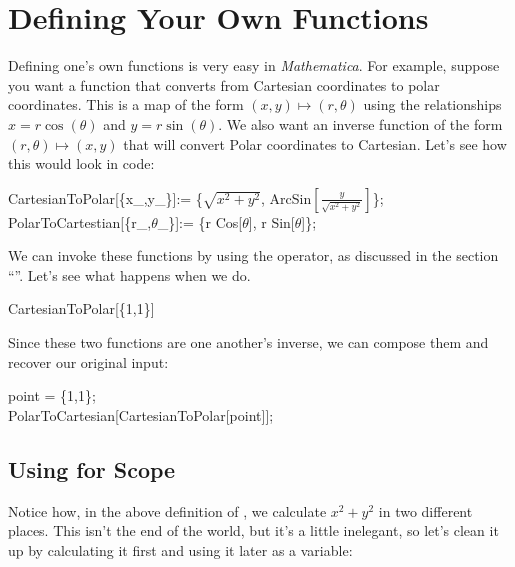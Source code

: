 \chapter{Defining Your Own Functions}
\label{chap:Functions}

Defining one's own functions is very easy in \emph{Mathematica}. For example, suppose you want a function that converts from Cartesian coordinates to polar coordinates. This is a map of the form $(x,y) \mapsto (r, \theta)$ using the relationships $x = r\cos(\theta)$ and $y = r\sin(\theta)$. We also want an inverse function of the form $(r, \theta) \mapsto (x,y)$ that will convert Polar coordinates to Cartesian. Let's see how this would look in code:

\begin{code}
	   CartesianToPolar[\{x\_,y\_\}]:= \{$\sqrt{x^2 + y^2}$, ArcSin$\left[\frac{y}{\sqrt{x^2 + y^2}}\right]$\};\\
	   PolarToCartestian[\{r\_,$\theta$\_\}]:= \{r Cos[$\theta$], r Sin[$\theta$]\};\\
\end{code}

We can invoke these functions by using the \expr{[]} operator, as discussed in the section ``''. Let's see what happens when we do. 

\begin{code}
	   CartesianToPolar[\{1,1\}]\\
\end{code}

Since these two functions are one another's inverse, we can compose them and recover our original input:

\begin{code}
	   point = \{1,1\};\\
	   PolarToCartesian[CartesianToPolar[point]];\\
\end{code}


\section{Using  for Scope}

Notice how, in the above definition of , we calculate $x^2 + y^2$ in two different places. This isn't the end of the world, but it's a little inelegant, so let's clean it up by calculating it first and using it later as a variable:

